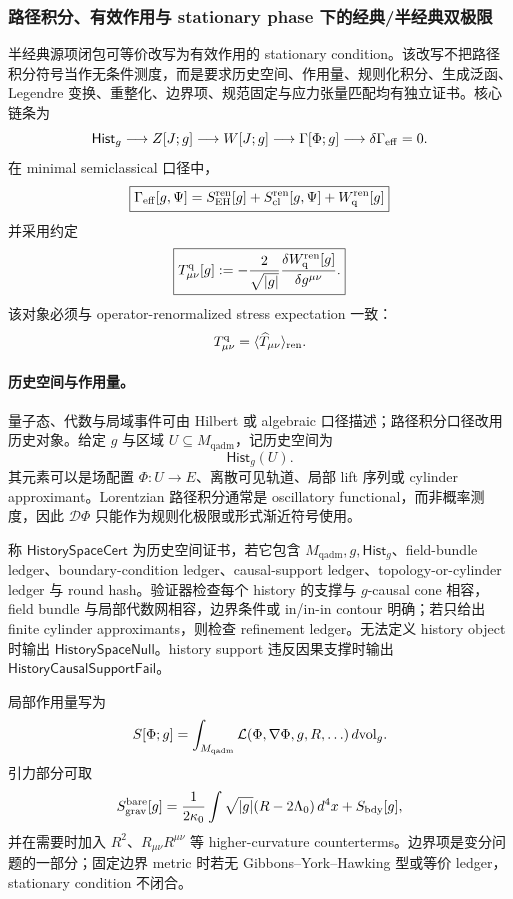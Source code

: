 \subsubsection{路径积分、有效作用与 stationary phase 下的经典/半经典双极限}\label{subsubsec:typed-address-biaxial-completion-effective-action-stationary-phase-double-limit}
半经典源项闭包可等价改写为有效作用的 stationary condition。该改写不把路径积分符号当作无条件测度，而是要求历史空间、作用量、规则化积分、生成泛函、Legendre 变换、重整化、边界项、规范固定与应力张量匹配均有独立证书。核心链条为
\[
\mathsf{Hist}_g
\longrightarrow
Z[J;g]
\longrightarrow
W[J;g]
\longrightarrow
\Gamma[\Phi;g]
\longrightarrow
\delta\Gamma_{\rm eff}=0.
\]
在 minimal semiclassical 口径中，
\[
\boxed{
\Gamma_{\rm eff}[g,\Psi]
=
S_{\rm EH}^{\rm ren}[g]
+
S_{\rm cl}^{\rm ren}[g,\Psi]
+
W_{\rm q}^{\rm ren}[g]
}
\]
并采用约定
\[
\boxed{
T^{\rm q}_{\mu\nu}[g]
:=
-\frac{2}{\sqrt{|g|}}
\frac{\delta W_{\rm q}^{\rm ren}[g]}{\delta g^{\mu\nu}}.
}
\]
该对象必须与 operator-renormalized stress expectation 一致：
\[
T^{\rm q}_{\mu\nu}
=
\langle\widehat T_{\mu\nu}\rangle_{\rm ren}.
\]

\paragraph{历史空间与作用量。}
量子态、代数与局域事件可由 Hilbert 或 algebraic 口径描述；路径积分口径改用历史对象。给定 \(g\) 与区域 \(U\subseteq M_{\mathrm{qadm}}\)，记历史空间为
\[
\mathsf{Hist}_g(U).
\]
其元素可以是场配置 \(\Phi:U\to E\)、离散可见轨道、局部 lift 序列或 cylinder approximant。Lorentzian 路径积分通常是 oscillatory functional，而非概率测度，因此 \(\mathcal D\Phi\) 只能作为规则化极限或形式渐近符号使用。

\begin{definition}[历史空间证书]\label{def:typed-address-biaxial-completion-history-space-cert}
称 \(\mathsf{HistorySpaceCert}\) 为历史空间证书，若它包含 \(M_{\mathrm{qadm}},g,\mathsf{Hist}_g\)、field-bundle ledger、boundary-condition ledger、causal-support ledger、topology-or-cylinder ledger 与 round hash。验证器检查每个 history 的支撑与 \(g\)-causal cone 相容，field bundle 与局部代数网相容，边界条件或 in/in-in contour 明确；若只给出 finite cylinder approximants，则检查 refinement ledger。无法定义 history object 时输出 \(\mathsf{HistorySpaceNull}\)。history support 违反因果支撑时输出 \(\mathsf{HistoryCausalSupportFail}\)。
\end{definition}

局部作用量写为
\[
S[\Phi;g]
=
\int_{M_{\mathrm{qadm}}}
\mathcal L(\Phi,\nabla\Phi,g,R,\ldots)\,d{\rm vol}_g.
\]
引力部分可取
\[
S_{\rm grav}^{\rm bare}[g]
=
\frac{1}{2\kappa_0}
\int\sqrt{|g|}(R-2\Lambda_0)\,d^4x
+
S_{\rm bdy}[g],
\]
并在需要时加入 \(R^2\)、\(R_{\mu\nu}R^{\mu\nu}\) 等 higher-curvature counterterms。边界项是变分问题的一部分；固定边界 metric 时若无 Gibbons--York--Hawking 型或等价 ledger，stationary condition 不闭合。

